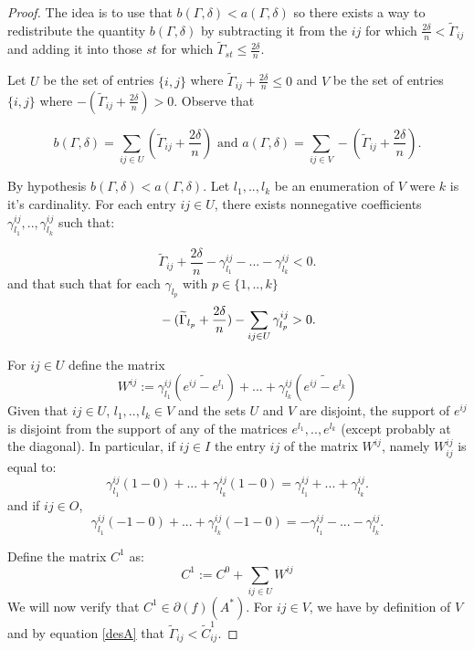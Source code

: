 \documentclass[12pt]{amsart}
\theoremstyle{remark}
\begin{document}
\begin{proof}
The idea is to use that $b(\Gamma,\delta) < a(\Gamma,\delta)$ so there exists a way to redistribute the quantity $b(\Gamma,\delta)$ by subtracting it from the $ij$ for which $\frac{2\delta}{n}< \widetilde{\Gamma}_{ij}$  and adding it into those $st$ for which $\widetilde{\Gamma}_{st}\leq \frac{2\delta}{n}$.


Let $U$ be the set of entries $\{i,j\}$ where $\widetilde{\Gamma}_{ij}+ \frac{2\delta}{n} \leq 0$ and $V$ be the  set of entries $\{i,j\}$ where $-(\widetilde{\Gamma}_{ij}+ \frac{2\delta}{n}) > 0$.
Observe that 

\[
b(\Gamma,\delta) = \sum_{ij \in U}( \widetilde{\Gamma}_{ij}+ \frac{2\delta}{n}) \text{ and } a(\Gamma,\delta) =  \sum_{ij \in V} -(\widetilde{\Gamma}_{ij} + \frac{2\delta}{n}).
\]

 By hypothesis $b(\Gamma,\delta)< a(\Gamma,\delta)$.
Let $l_1,..,l_k$ be an enumeration of $V$ were $k$ is it's cardinality. For each entry $ij \in U$, there exists nonnegative coefficients $\gamma^{ij}_{l_1},..,\gamma^{ij}_{l_k}$ such that:

\[
 \widetilde{\Gamma}_{ij}+\frac{2\delta}{n}-\gamma^{ij}_{l_1}-...-\gamma^{ij}_{l_k} < 0. 
\]
and that such that for each  $\gamma_{l_p}$ with $p \in \{1,..,k\}$
\begin{equation}{\label{desA}}
-(\widetilde{\Gamma}_{l_p}+\frac{2\delta}{n})-\sum_{ij \in U}\gamma^{ij}_{l_p}>0.
\end{equation}




For $ij \in U$ define the matrix
\[
W^{ij}:= \gamma^{ij}_{l_1}(\widetilde{e^{ij}-e^{l_1}} )+...+\gamma^{ij}_{l_k}(\widetilde{e^{ij}-e^{l_k}})
\]
Given that $ij \in U$, $l_1,..,l_k \in V$ and the sets $U$ and $V$ are disjoint, the support of $e^{ij}$ is disjoint from the support of any of the matrices $e^{l_1},..,e^{l_k}$ (except probably at the diagonal). In particular, if $ij\in I$ the entry $ij$ of the matrix $W^{ij}$, namely $W^{ij}_{ij}$ is equal to:
\[
\gamma^{ij}_{l_1}(1-0)+...+\gamma^{ij}_{l_k}(1-0)= \gamma^{ij}_{l_1}+...+\gamma^{ij}_{l_k}.
\]
and if  $ij\in O$,
\[
\gamma^{ij}_{l_1}(-1-0)+...+\gamma^{ij}_{l_k}(-1-0)= -\gamma^{ij}_{l_1}-...-\gamma^{ij}_{l_k}.
\]

Define the matrix $C^1$ as:
\[C^1:= C^0 + \sum_{ij \in U} W^{ij} \]
We will now verify that $C^1 \in \partial(f)(A^*)$.
For $ij \in V$, we have by definition of $V$ and by equation \ref{desA} that $\widetilde{\Gamma}_{ij}< \widetilde{C}^1_{ ij}$.  


\end{proof}
\end{document}
